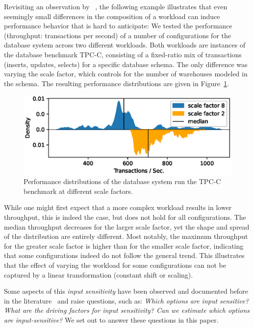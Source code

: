 Revisiting an observation by \citeauthor{alves_sampling_2020}~\cite{alves_sampling_2020}, the following example illustrates that even seemingly small differences in the composition of a workload can induce performance behavior that is hard to anticipate: We tested the performance (throughput: transactions per second) of a number of configurations for the database system \htwo across two different workloads. Both workloads are instances of the database benchmark \textsf{TPC-C}, consisting of a fixed-ratio mix of transactions (inserts, updates, selects) for a specific database schema. The only difference was varying the scale factor, which controls for the number of warehouses modeled in the schema. The resulting performance distributions are given in Figure~\ref{fig:h2_intro}.
\begin{figure}
	\centering
	\includegraphics[width=0.85\linewidth]{images/h2_motivation.eps}
	\caption{Performance distributions of the database system \htwo run the \textsf{TPC-C} benchmark at different scale factors.}
	\label{fig:h2_intro}
\end{figure}
While one might first expect that a more complex workload results in lower throughput, this is indeed the case, but does not hold for all configurations. The median throughput decreases for the larger scale factor, yet the shape and spread of the distribution are entirely different. Most notably, the maximum throughput for the greater scale factor is higher than for the smaller scale factor, indicating that some configurations indeed do not follow the general trend. This illustrates that the effect of varying the workload for some configurations can not be captured by a linear transformation (constant shift or scaling).


Some aspects of this \emph{input sensitivity} have been observed and documented before in the literature~\cite{liao_2020_using_emse,alves_sampling_2020,jamishidi_transfer_2017} and raise questions, such as: \textit{Which options are input sensitive? What are the driving factors for input sensitivity? Can we estimate which options are input-sensitive?} We set out to answer these questions in this paper.
	
